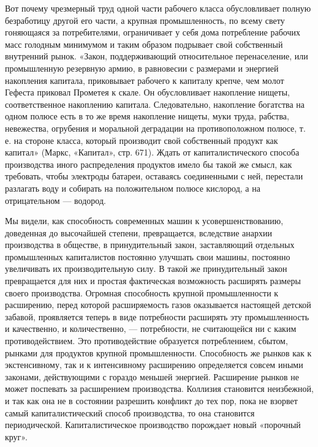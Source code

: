 \documentclass[12pt]{article}
\newcommand{\parnum}{(\arabic{parcount})}
\newcounter{parcount}
\newenvironment{parnumbers}{%
  \par%
  \everypar{\noindent \stepcounter{parcount}\marginpar[]{\parnum}}%
}{}
\begin{document}
\begin{parnumbers}
    Вот почему чрезмерный труд одной части рабочего класса обусловливает полную безработицу другой его части, а крупная промышленность, по всему свету гоняющаяся за потребителями, ограничивает у себя дома потребление рабочих масс голодным минимумом и таким образом подрывает свой собственный внутренний рынок. «Закон, поддерживающий относительное перенаселение, или промышленную резервную армию, в равновесии с размерами и энергией накопления капитала, приковывает рабочего к капиталу крепче, чем молот Гефеста приковал Прометея к скале. Он обусловливает накопление нищеты, соответственное накоплению капитала. Следовательно, накопление богатства на одном полюсе есть в то же время накопление нищеты, муки труда, рабства, невежества, огрубения и моральной деградации на противоположном полюсе, т. е. на стороне класса, который производит свой собственный продукт как капитал» (Маркс, «Капитал», стр. 671). Ждать от капиталистического способа производства иного распределения продуктов имело бы такой же смысл, как требовать, чтобы электроды батареи, оставаясь соединенными с ней, перестали разлагать воду и собирать на положительном полюсе кислород, а на отрицательном — водород.

    Мы видели, как способность современных машин к усовершенствованию, доведенная до высочайшей степени, превращается, вследствие анархии производства в обществе, в принудительный закон, заставляющий отдельных промышленных капиталистов постоянно улучшать свои машины, постоянно увеличивать их производительную силу. В такой же принудительный закон превращается для них и простая фактическая возможность расширять размеры своего производства. Огромная способность крупной промышленности к расширению, перед которой расширяемость газов оказывается настоящей детской забавой, проявляется теперь в виде потребности расширять эту промышленность и качественно, и количественно, — потребности, не считающейся ни с каким противодействием. Это противодействие образуется потреблением, сбытом, рынками для продуктов крупной промышленности. Способность же рынков как к экстенсивному, так и к интенсивному расширению определяется совсем иными законами, действующими с гораздо меньшей энергией. Расширение рынков не может поспевать за расширением производства. Коллизия становится неизбежной, и так как она не в состоянии разрешить конфликт до тех пор, пока не взорвет самый капиталистический способ производства, то она становится периодической. Капиталистическое производство порождает новый «порочный круг».


\end{parnumbers}
\end{document}
